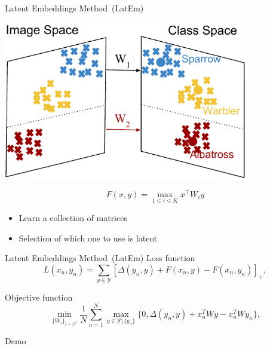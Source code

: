 \documentclass[mathserif, xcolor=table]{beamer}
\def\D{\Delta}
\def\Y{\mathcal{Y}}
\def\Y{\mathcal{Y}}
\begin{document}
\begin{frame}{Latent Embeddings Method~(LatEm)}
\vspace{-4mm}
\begin{center}
\includegraphics[width=0.8\textwidth]{nonlinear_teaser2}
\end{center}
\vspace{-4mm}
\begin{equation*}
F(x,y) = \max_{1\leq i \leq K} x^\top W_i y
\end{equation*}
\vspace{-4mm}
\begin{itemize}
	\item Learn a collection of matrices
	\item Selection of which one to use is latent
\end{itemize}

\end{frame}


\begin{frame}{Latent Embeddings Method~(LatEm)}
Loss function
\begin{equation*}
    L(x_n,y_n) = \sum_{y \in \Y} \left[\D(y_n,y) + F(x_n,y) -F(x_n,y_n)\right]_+,
\end{equation*}

Objective function
\begin{equation*}
        \min_{\{W_i\}_{i=1^K}} \frac{1}{N} \sum_{n=1}^{N} \max_{y\in \Y \setminus \{y_n\}} \{0, \D(y_n,y) + x_n^T W y-x_n^T W y_n\},
\end{equation*}

\end{frame}

\begin{frame}{Demo}


\end{frame}
\end{document}
